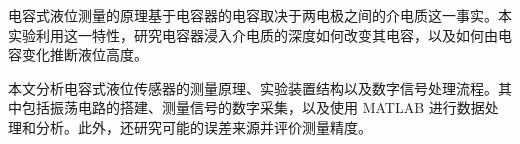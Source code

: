 电容式液位测量的原理基于电容器的电容取决于两电极之间的介电质这一事实。本实验利用这一特性，研究电容器浸入介电质的深度如何改变其电容，以及如何由电容变化推断液位高度。

本文分析电容式液位传感器的测量原理、实验装置结构以及数字信号处理流程。其中包括振荡电路的搭建、测量信号的数字采集，以及使用 MATLAB 进行数据处理和分析。此外，还研究可能的误差来源并评价测量精度。
